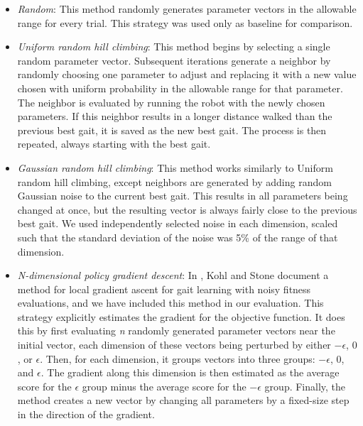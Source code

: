 

\begin{itemize}

\item \emph{Random}: This method randomly generates parameter vectors
  in the allowable range for every trial. This strategy was used only
  as baseline for comparison.

\item \emph{Uniform random hill climbing}: This method begins by
  selecting a single random parameter vector.  Subsequent iterations
  generate a neighbor by randomly choosing one parameter to adjust and
  replacing it with a new value chosen with uniform probability in the
  allowable range for that parameter. The neighbor is evaluated by
  running the robot with the newly chosen parameters. If this neighbor
  results in a longer distance walked than the previous best gait, it
  is saved as the new best gait. The process is then repeated, always
  starting with the best gait.

\item \emph{Gaussian random hill climbing}: This method works
  similarly to Uniform random hill climbing, except neighbors are
  generated by adding random Gaussian noise to the current best gait.
  This results in all parameters being changed at once, but the
  resulting vector is always fairly close to the previous best gait.
  We used independently selected noise in each dimension, scaled such
  that the standard deviation of the noise was 5\% of the range of
  that dimension.

\item \emph{N-dimensional policy gradient descent}: In \cite{kohl},
  Kohl and Stone document a method for local gradient ascent for gait
  learning with noisy fitness evaluations, and we have included this
  method in our evaluation.  This strategy explicitly estimates the
  gradient for the objective function. It does this by first
  evaluating \emph{n} randomly generated parameter vectors near the
  initial vector, each dimension of these vectors being perturbed by
  either $-\epsilon$, $0$, or $\epsilon$. Then, for each dimension, it
  groups vectors into three groups: $-\epsilon$, $0$, and $\epsilon$.
  The gradient along this dimension is then estimated as the average
  score for the $\epsilon$ group minus the average score for the
  $-\epsilon$ group. Finally, the method creates a new vector by
  changing all parameters by a fixed-size step in the direction of the
  gradient.


\end{itemize}
